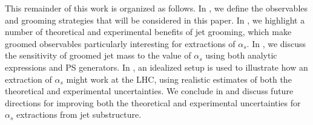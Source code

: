 This remainder of this work is organized as follows.
%
In , we define the observables and grooming strategies that will be considered in this paper.
%
In , we highlight a number of theoretical and experimental benefits of jet grooming, which make groomed observables particularly interesting for extractions of $\alpha_s$.
%
In , we discuss the sensitivity of groomed jet mass to the value of $\alpha_s$ using both analytic expressions and PS generators.
%
In , an idealized setup is used to illustrate how an extraction of $\alpha_s$ might work at the LHC, using realistic estimates of both the theoretical and experimental uncertainties.
%
We conclude in  and discuss future directions for improving both the theoretical and experimental uncertainties for $\alpha_s$ extractions from jet substructure.














\begin{comment}
\begin{itemize}
\item Laying the groundwork for high precision ($\mathcal{O}(1\%)$) extractions of $\alpha_s$ for the full LHC dataset or a future $e^+e^-$ machine.
\item Competitive measurements with existing LHC extractions of $\alpha_s$ (5\%)
\item Probing the tension between thrust (and friends) extractions with lattice (10\%)
\item Parton shower MC (15\%)
\end{itemize}
\end{comment}







